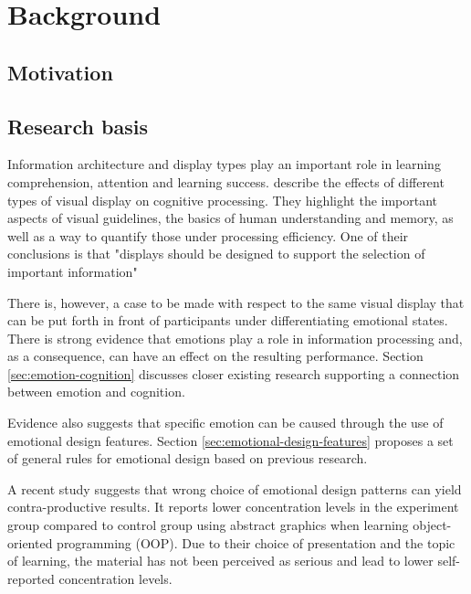 \clearpage

\section{Background}

	\subsection{Motivation}
	
	
		
	\subsection{Research basis} \label{sec:research}
	
	Information architecture and display types play an important role in learning comprehension, attention and learning success. \cite{McCrudden2017} describe the effects of different types of visual display on cognitive processing. They highlight the important aspects of visual guidelines, the basics of human understanding and  memory, as well as a way to quantify those under processing efficiency. One of their conclusions is that "displays should be designed to support the selection of important information" \cite[p.633]{McCrudden2017}
	
	There is, however, a case to be made with respect to the same visual display that can be put forth in front of participants under differentiating emotional states. There is strong evidence that emotions play a role in information processing and, as a consequence, can have an effect on the resulting performance. Section \ref{sec:emotion-cognition} discusses closer existing research supporting a connection between emotion and cognition.
	
	Evidence also suggests that specific emotion can be caused through the use of emotional design features. Section \ref{sec:emotional-design-features} proposes a set of general rules for emotional design based on previous research.
	
	A recent study \cite{Haaranen2015} suggests that wrong choice of emotional design patterns can yield contra-productive results. It reports lower concentration levels in the experiment group compared to control group using abstract graphics when learning object-oriented programming (OOP). Due to their choice of presentation and the topic of learning, the material has not been perceived as serious and lead to lower self-reported concentration levels.
		
